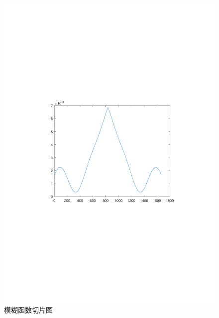 \begin{figure}
	\centering
	\includegraphics[width=\textwidth]{figures/af.pdf}
	\caption{模糊函数切片图}
\end{figure}

